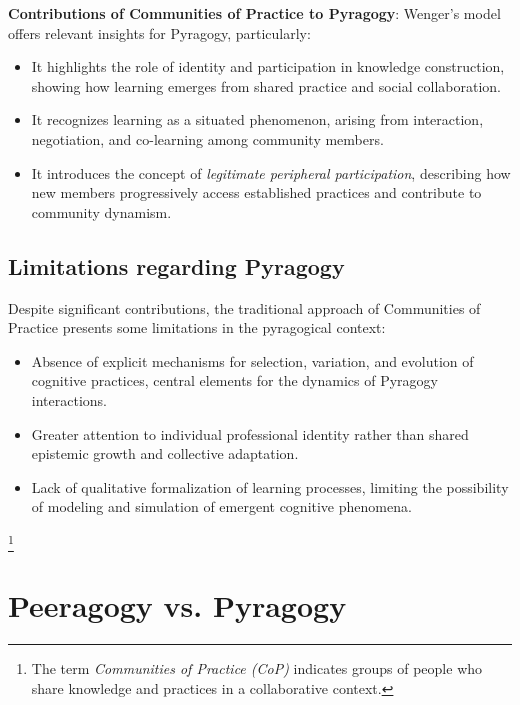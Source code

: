 \vspace{1cm}

\textbf{Contributions of Communities of Practice to Pyragogy}:  
Wenger's model \cite{Wenger1998} offers relevant insights for Pyragogy, particularly:

\begin{itemize}
	\item It highlights the role of identity and participation in knowledge construction, showing how learning emerges from shared practice and social collaboration.
	\item It recognizes learning as a situated phenomenon, arising from interaction, negotiation, and co-learning among community members.
	\item It introduces the concept of \textit{legitimate peripheral participation}, describing how new members progressively access established practices and contribute to community dynamism.
\end{itemize}

\subsection{Limitations regarding Pyragogy}

Despite significant contributions, the traditional approach of Communities of Practice presents some limitations in the pyragogical context:

\begin{itemize}
	\item Absence of explicit mechanisms for selection, variation, and evolution of cognitive practices, central elements for the dynamics of Pyragogy interactions.
	\item Greater attention to individual professional identity rather than shared epistemic growth and collective adaptation.
	\item Lack of qualitative formalization of learning processes, limiting the possibility of modeling and simulation of emergent cognitive phenomena.
\end{itemize}

\footnote{The term \emph{Communities of Practice (CoP)} indicates groups of people who share knowledge and practices in a collaborative context.}

\newpage

\section{Peeragogy vs. Pyragogy}
